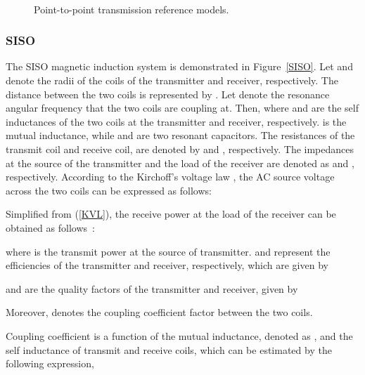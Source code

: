 \documentclass[twocolumn,10pt]{IEEEtran}
\begin{document}
 \begin{figure} 
 \centering
  \centering
     \\
   \centering
 \centering
 \centering
 \caption{Point-to-point transmission reference models.} 
 \label{P2P_model}
 \end{figure}
 

 
\subsubsection{SISO}

The SISO magnetic induction system is demonstrated in Figure~\ref{SISO}. Let  and  denote the radii of the coils of the transmitter and receiver, respectively. The distance between the two coils is represented by . Let  denote the resonance angular frequency that the two coils are coupling at. Then,  where  and  are the self inductances of the two coils at the transmitter and receiver, respectively.  is the mutual inductance, while  and  are two resonant capacitors. The resistances of the transmit coil and receive coil, are denoted by  and , respectively. The impedances at the source of the transmitter and the load of the receiver are denoted as  and , respectively. According to the Kirchoff's voltage law \cite{H.2013Nguyen}, the AC source voltage across the two coils can be expressed as follows:


Simplified from (\ref{KVL}), the receive power at the load of the receiver can be obtained as follows~\cite{U.2012Azad}:

where  is the transmit power at the source of transmitter. 
 and  represent the efficiencies of the transmitter and receiver, respectively, which are given by 

 and  are the quality factors of the transmitter and receiver, given by

Moreover,  denotes the coupling coefficient factor between the two coils.

Coupling coefficient is a function of the mutual inductance, denoted as , and the self inductance of transmit and receive coils, which can be estimated by the following expression, 
\end{document}
